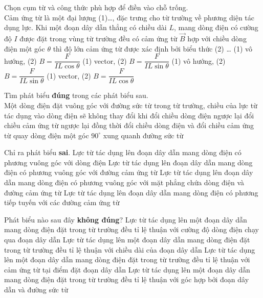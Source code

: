 \begin{ex}
	Chọn cụm từ và công thức phù hợp để điền vào chỗ trống.\\
	Cảm ứng từ là một đại lượng (1)\dots, đặc trưng cho từ trường về phương diện tác dụng lực. Khi một đoạn dây dẫn thẳng có chiều dài $L$, mang dòng điện có cường độ $I$ được đặt trong vùng từ trường đều có cảm ứng từ $\vec{B}$ hợp với chiều dòng điện một góc $\theta$ thì độ lớn cảm ứng từ được xác định bởi biểu thức (2) \dots
	\choice
	{(1) vô hướng, (2) $B=\dfrac{F}{IL\cos\theta}$}
	{\True (1) vector, (2) $B=\dfrac{F}{IL\sin\theta}$}
	{(1) vô hướng, (2) $B=\dfrac{F}{IL\sin\theta}$}
	{(1) vector, (2) $B=\dfrac{F}{IL\cos\theta}$}
	\loigiai{}
\end{ex}
\begin{ex}
	Tìm phát biểu \textbf{đúng} trong các phát biểu sau.\\
	Một dòng điện đặt vuông góc với đường sức từ trong từ trường, chiều của lực từ tác dụng vào dòng điện sẽ không thay đổi khi
	\choice
	{đổi chiều dòng điện ngược lại}
	{đổi chiều cảm ứng từ ngược lại}
	{\True đồng thời đổi chiều dòng điện và đổi chiều cảm ứng từ}
	{quay dòng điện một góc $90^{\circ}$ xung quanh đường sức từ}
	\loigiai{}
\end{ex}
\begin{ex}
	Chỉ ra phát biểu \textbf{sai}.
	\choice
	{Lực từ tác dụng lên đoạn dây dẫn mang dòng điện có phương vuông góc với dòng điện}
	{Lực từ tác dụng lên đoạn dây dẫn mang dòng điện có phương vuông góc với đường cảm ứng từ}
	{\True Lực từ tác dụng lên đoạn dây dẫn mang dòng điện có phương vuông góc với mặt phẳng chứa dòng điện và đường cảm ứng từ}
	{Lực từ tác dụng lên đoạn dây dẫn mang dòng điện có phương tiếp tuyến với các đường cảm ứng từ}
	\loigiai{}
\end{ex}
\begin{ex}
	Phát biểu nào sau đây \textbf{không đúng}?	
	\choice
	{Lực từ tác dụng lên một đoạn dây dẫn mang dòng điện đặt trong từ trường đều tỉ lệ thuận với cường độ dòng điện chạy qua đoạn dây dẫn}
	{Lực từ tác dụng lên một đoạn dây dẫn mang dòng điện đặt trong từ trường đều tỉ lệ thuận với chiều dài của đoạn dây dẫn}
	{Lực từ tác dụng lên một đoạn dây dẫn mang dòng điện đặt trong từ trường đều tỉ lệ thuận với cảm ứng từ tại điểm đặt đoạn dây dẫn}
	{\True Lực từ tác dụng lên một đoạn dây dẫn mang dòng điện đặt trong từ trường đều tỉ lệ thuận với góc hợp bởi đoạn dây dẫn và đường sức từ}
\end{ex}
